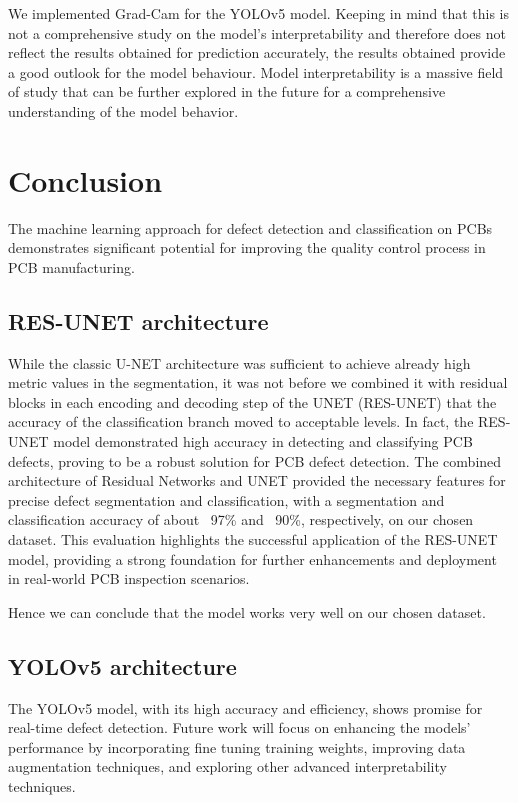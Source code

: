\documentclass[12pt]{article}
\begin{document}
We implemented Grad-Cam for the YOLOv5 model. Keeping in mind that this is not a comprehensive study on the model's interpretability and therefore does not reflect the results obtained for prediction accurately, the results obtained provide a good outlook for the model behaviour. 
Model interpretability is a massive field of study that can be further explored in the future for a comprehensive understanding of the model behavior.

\clearpage
\newpage

\section{Conclusion}

The machine learning approach for defect detection and classification on PCBs demonstrates significant potential for improving the quality control process in PCB manufacturing. 

\subsection{RES-UNET architecture}
While the classic U-NET architecture was sufficient to achieve already high metric values in the segmentation, it was not before we combined it with residual blocks in each encoding and decoding step of the UNET (RES-UNET) that the accuracy of the classification branch moved to acceptable levels. In fact, the RES-UNET model demonstrated high accuracy in detecting and classifying PCB defects, proving to be a robust solution for PCB defect detection. The combined architecture of Residual Networks and UNET provided the necessary features for precise defect segmentation and classification,  with a segmentation and classification accuracy of about ~97\% and ~90\%, respectively, on our chosen dataset. This evaluation highlights the successful application of the RES-UNET model, providing a strong foundation for further enhancements and deployment in real-world PCB inspection scenarios.

Hence we can conclude that the model works very well on our chosen dataset.

\subsection{YOLOv5 architecture}
The YOLOv5 model, with its high accuracy and efficiency, shows promise for real-time defect detection. Future work will focus on enhancing the models' performance by incorporating fine tuning training weights, improving data augmentation techniques, and exploring other advanced interpretability techniques.
\end{document}

